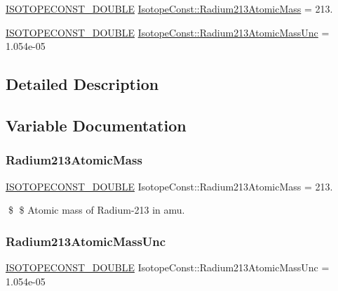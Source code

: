 \begin{DoxyCompactItemize}
\item 
\mbox{\hyperlink{group___isotope_const-_macros_ga8f45a7272ce02c0b4c65c44636ed719a}{I\+S\+O\+T\+O\+P\+E\+C\+O\+N\+S\+T\+\_\+\+D\+O\+U\+B\+LE}} \mbox{\hyperlink{group___isotope_const-_radium-_ra213_ga83796fb1c2312f29b39ade238189b9a9}{Isotope\+Const\+::\+Radium213\+Atomic\+Mass}} = 213.
\item 
\mbox{\hyperlink{group___isotope_const-_macros_ga8f45a7272ce02c0b4c65c44636ed719a}{I\+S\+O\+T\+O\+P\+E\+C\+O\+N\+S\+T\+\_\+\+D\+O\+U\+B\+LE}} \mbox{\hyperlink{group___isotope_const-_radium-_ra213_ga06c1bb095832b1a5f9c47152a1367d16}{Isotope\+Const\+::\+Radium213\+Atomic\+Mass\+Unc}} = 1.\+054e-\/05
\end{DoxyCompactItemize}


\subsection{Detailed Description}


\subsection{Variable Documentation}
\mbox{\label{group___isotope_const-_radium-_ra213_ga83796fb1c2312f29b39ade238189b9a9}} 
\subsubsection{\texorpdfstring{Radium213\+Atomic\+Mass}{Radium213AtomicMass}}
{\footnotesize\ttfamily \mbox{\hyperlink{group___isotope_const-_macros_ga8f45a7272ce02c0b4c65c44636ed719a}{I\+S\+O\+T\+O\+P\+E\+C\+O\+N\+S\+T\+\_\+\+D\+O\+U\+B\+LE}} Isotope\+Const\+::\+Radium213\+Atomic\+Mass = 213.}

\$ \$ Atomic mass of Radium-\/213 in amu. \mbox{\label{group___isotope_const-_radium-_ra213_ga06c1bb095832b1a5f9c47152a1367d16}} 
\subsubsection{\texorpdfstring{Radium213\+Atomic\+Mass\+Unc}{Radium213AtomicMassUnc}}
{\footnotesize\ttfamily \mbox{\hyperlink{group___isotope_const-_macros_ga8f45a7272ce02c0b4c65c44636ed719a}{I\+S\+O\+T\+O\+P\+E\+C\+O\+N\+S\+T\+\_\+\+D\+O\+U\+B\+LE}} Isotope\+Const\+::\+Radium213\+Atomic\+Mass\+Unc = 1.\+054e-\/05}

